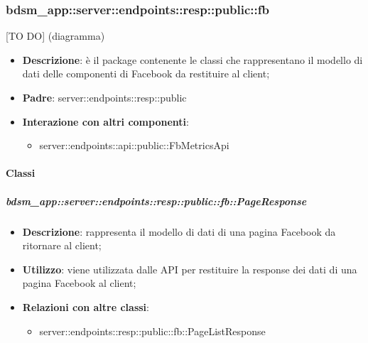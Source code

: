 \subsubsection{bdsm\_app::server::endpoints::resp::public::fb} %
\label{ssub:bdsm_app_server_endpoints_resp_public_fb}
[TO DO] (diagramma) \newline \newline

\begin{itemize}
  \item \textbf{Descrizione}: è il package contenente le classi che rappresentano il modello di dati delle componenti di Facebook da restituire al client;
  \item \textbf{Padre}: server::endpoints::resp::public
  \item \textbf{Interazione con altri componenti}:
  	\begin{itemize}
  		\item server::endpoints::api::public::FbMetricsApi
  	\end{itemize}
\end{itemize}

	\paragraph{Classi} %

    \subparagraph{bdsm\_app::server::endpoints::resp::public::fb::PageResponse} %
    \label{subp:bdsm_app_server_endpoints_resp_public_fb_pageresponse}
    \begin{itemize}
      \item \textbf{Descrizione}: rappresenta il modello di dati di una pagina Facebook da ritornare al client;
      \item \textbf{Utilizzo}: viene utilizzata dalle API per restituire la response dei dati di una pagina Facebook al client;
      \item \textbf{Relazioni con altre classi}:
        \begin{itemize}
          \item server::endpoints::resp::public::fb::PageListResponse
        \end{itemize}
      \end{itemize}
    
